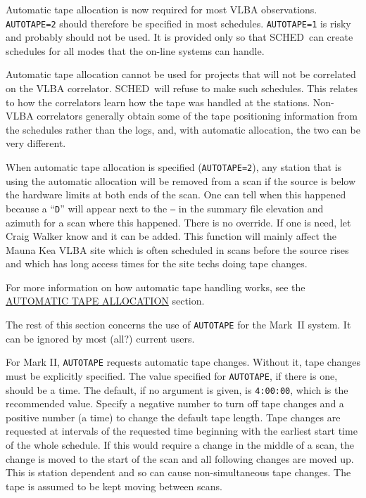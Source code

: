 \documentclass{report}
\newcommand{\schedb}{{\sc SCHED~}}
\begin{document}
Automatic tape allocation is now required for most VLBA observations.
{\tt AUTOTAPE=2} should therefore be specified in most schedules.
{\tt AUTOTAPE=1} is risky and probably should not be used.  It is
provided only so that \schedb can create schedules for all modes
that the on-line systems can handle.

Automatic tape allocation cannot be used for projects that will not
be correlated on the VLBA correlator.  \schedb will refuse to make
such schedules.  This relates to how the correlators learn how the
tape was handled at the stations.  Non-VLBA correlators generally
obtain some of the tape positioning information from the schedules
rather than the logs, and, with automatic allocation, the two
can be very different.

When automatic tape allocation is specified ({\tt AUTOTAPE=2}), any
station that is using the automatic allocation will be removed from a
scan if the source is below the hardware limits at both ends of the
scan.  One can tell when this happened because a ``{\tt D}'' will
appear next to the {\tt ---} in the summary file elevation and azimuth
for a scan where this happened.  There is no override.  If one is
need, let Craig Walker know and it can be added.  This function
will mainly affect the Mauna Kea VLBA site which is often scheduled
in scans before the source rises and which has long access times
for the site techs doing tape changes.

For more information on how automatic tape handling works, see the
{\hyperref[SSSEC:AUTOTAPE]{AUTOMATIC TAPE ALLOCATION}} section.

The rest of this section concerns the use of {\tt AUTOTAPE} for
the Mark~II system.  It can be ignored by most (all?) current
users.

For Mark II, {\tt AUTOTAPE} requests automatic tape changes.  Without
it, tape changes must be explicitly specified.  The value specified
for {\tt AUTOTAPE}, if there is one, should be a time.  The default,
if no argument is given, is {\tt 4:00:00}, which is the recommended
value.  Specify a negative number to turn off tape changes and a
positive number (a time) to change the default tape length.  Tape
changes are requested at intervals of the requested time beginning
with the earliest start time of the whole schedule. If this would
require a change in the middle of a scan, the change is moved to the
start of the scan and all following changes are moved up. This is
station dependent and so can cause non-simultaneous tape changes. The
tape is assumed to be kept moving between scans.
\end{document}
